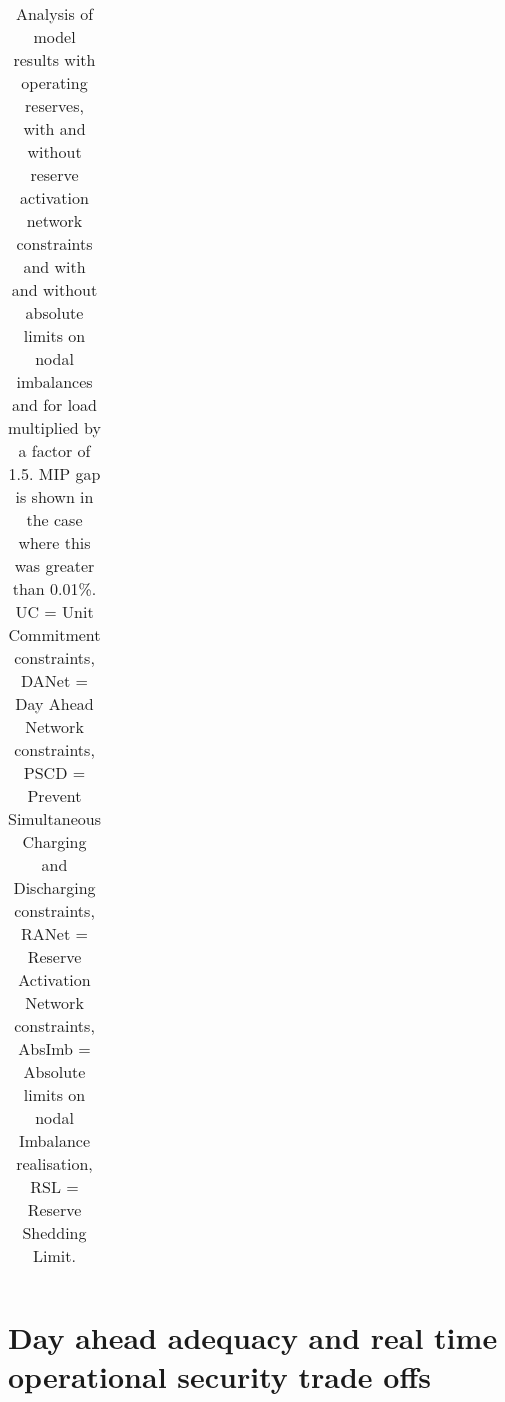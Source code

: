\documentclass[number,times]{elsarticle}
\begin{document}
\begin{table}[ht]
\begin{tabular}{ccccccccc}
        \bottomrule
    \end{tabular}
    \caption{Analysis of model results with operating reserves, with and without reserve activation network constraints and with and without absolute limits on nodal imbalances and for load multiplied by a factor of 1.5. MIP gap is shown in the case where this was greater than 0.01\%. UC = Unit Commitment constraints, DANet = Day Ahead Network constraints, PSCD = Prevent Simultaneous Charging and Discharging constraints, RANet = Reserve Activation Network constraints, AbsImb = Absolute limits on nodal Imbalance realisation, RSL = Reserve Shedding Limit.}\label{tab:results_with_RANet_LM_15}
\end{table}

\section{Day ahead adequacy and real time operational security trade offs} \label{sec:adequacy_vs_security}

\clearpage


\end{document}
